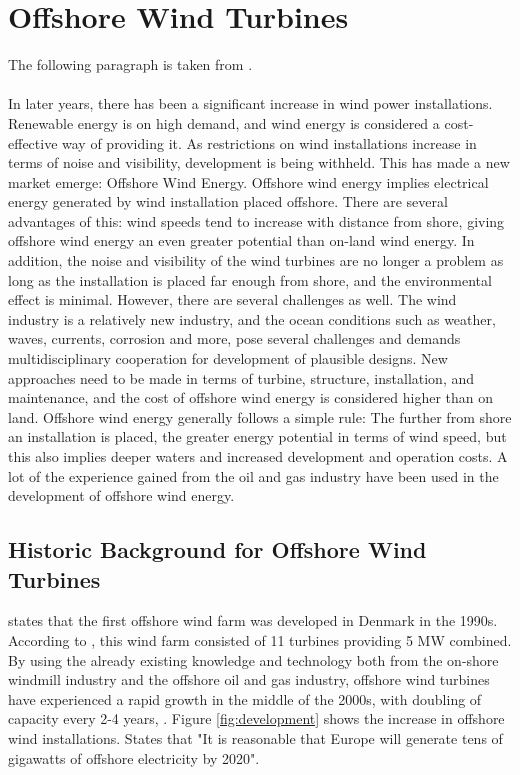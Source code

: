 \section{Offshore Wind Turbines}
The following paragraph is taken from \cite{Kapsali2012}.\\\\ In later years, there has been a significant increase in wind power installations. Renewable energy is on high demand, and wind energy is considered a cost-effective way of providing it. As restrictions on wind installations increase in terms of noise and visibility, development is being withheld. This has made a new market emerge: Offshore Wind Energy. Offshore wind energy implies electrical energy generated by wind installation placed offshore.  There are several advantages of this: wind speeds tend to increase with distance from shore, giving offshore wind energy an even greater potential than on-land wind energy. In addition, the noise and visibility of the wind turbines are no longer a problem as long as the installation is placed far enough from shore, and the environmental effect is minimal. However, there are several challenges as well. The wind industry is a relatively new industry, and the ocean conditions such as weather, waves, currents, corrosion and more, pose several challenges and demands multidisciplinary cooperation for development of plausible designs. New approaches need to be made in terms of turbine, structure, installation, and maintenance, and the cost of offshore wind energy is considered higher than on land. Offshore wind energy generally follows a simple rule: The further from shore an installation is placed, the greater energy potential in terms of wind speed, but this also implies deeper waters and increased development and operation costs. A lot of the experience gained from the oil and gas industry have been used in the development of offshore wind energy. 

\subsection{Historic Background for Offshore Wind Turbines}
\cite{NG2016} states that the first offshore wind farm was developed in Denmark in the 1990s. According to \cite{Lynn2011}, this wind farm consisted of 11 turbines providing 5 MW combined.  By using the already existing knowledge and technology both from the on-shore windmill industry and the offshore oil and gas industry, offshore wind turbines have experienced a rapid growth in the middle of the 2000s, with doubling of capacity every 2-4 years, \cite{NG2016}. Figure \ref{fig:development} shows the increase in offshore wind installations. \cite{Lynn2011} States that "It is reasonable that Europe will generate tens of gigawatts of offshore electricity by 2020".


